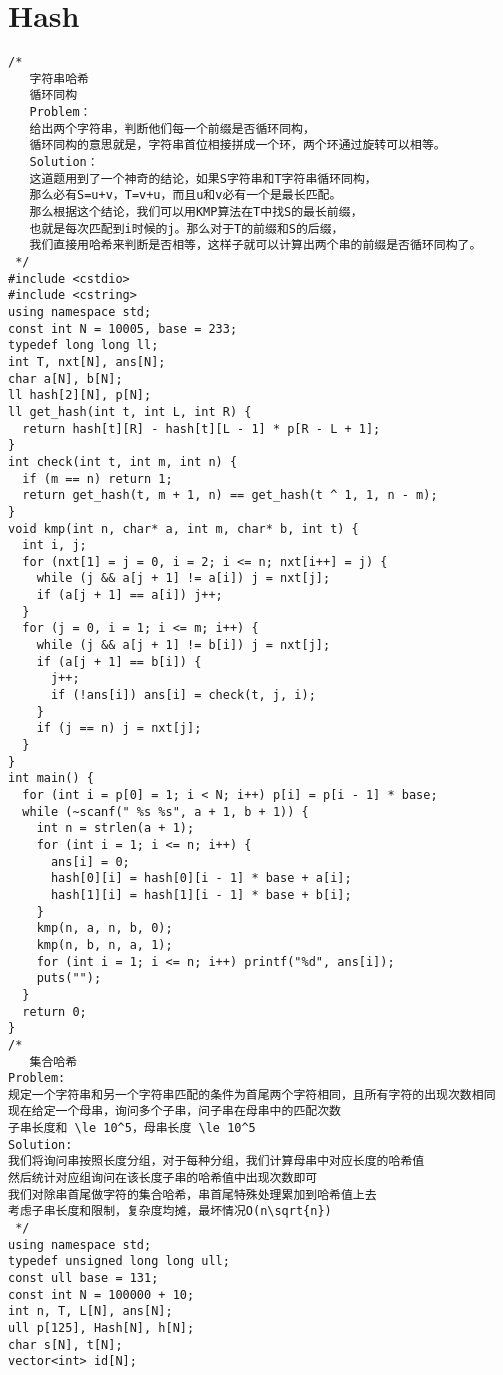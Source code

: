 \section{ Hash}
\begin{lstlisting}
/*
   字符串哈希
   循环同构
   Problem：
   给出两个字符串，判断他们每一个前缀是否循环同构，
   循环同构的意思就是，字符串首位相接拼成一个环，两个环通过旋转可以相等。
   Solution：
   这道题用到了一个神奇的结论，如果S字符串和T字符串循环同构，
   那么必有S=u+v，T=v+u，而且u和v必有一个是最长匹配。
   那么根据这个结论，我们可以用KMP算法在T中找S的最长前缀，
   也就是每次匹配到i时候的j。那么对于T的前缀和S的后缀，
   我们直接用哈希来判断是否相等，这样子就可以计算出两个串的前缀是否循环同构了。
 */
#include <cstdio>
#include <cstring>
using namespace std;
const int N = 10005, base = 233;
typedef long long ll;
int T, nxt[N], ans[N];
char a[N], b[N];
ll hash[2][N], p[N];
ll get_hash(int t, int L, int R) {
  return hash[t][R] - hash[t][L - 1] * p[R - L + 1];
}
int check(int t, int m, int n) {
  if (m == n) return 1;
  return get_hash(t, m + 1, n) == get_hash(t ^ 1, 1, n - m);
}
void kmp(int n, char* a, int m, char* b, int t) {
  int i, j;
  for (nxt[1] = j = 0, i = 2; i <= n; nxt[i++] = j) {
    while (j && a[j + 1] != a[i]) j = nxt[j];
    if (a[j + 1] == a[i]) j++;
  }
  for (j = 0, i = 1; i <= m; i++) {
    while (j && a[j + 1] != b[i]) j = nxt[j];
    if (a[j + 1] == b[i]) {
      j++;
      if (!ans[i]) ans[i] = check(t, j, i);
    }
    if (j == n) j = nxt[j];
  }
}
int main() {
  for (int i = p[0] = 1; i < N; i++) p[i] = p[i - 1] * base;
  while (~scanf(" %s %s", a + 1, b + 1)) {
    int n = strlen(a + 1);
    for (int i = 1; i <= n; i++) {
      ans[i] = 0;
      hash[0][i] = hash[0][i - 1] * base + a[i];
      hash[1][i] = hash[1][i - 1] * base + b[i];
    }
    kmp(n, a, n, b, 0);
    kmp(n, b, n, a, 1);
    for (int i = 1; i <= n; i++) printf("%d", ans[i]);
    puts("");
  }
  return 0;
}
/*
   集合哈希
Problem:
规定一个字符串和另一个字符串匹配的条件为首尾两个字符相同，且所有字符的出现次数相同
现在给定一个母串，询问多个子串，问子串在母串中的匹配次数
子串长度和 \le 10^5，母串长度 \le 10^5
Solution:
我们将询问串按照长度分组，对于每种分组，我们计算母串中对应长度的哈希值
然后统计对应组询问在该长度子串的哈希值中出现次数即可
我们对除串首尾做字符的集合哈希，串首尾特殊处理累加到哈希值上去
考虑子串长度和限制，复杂度均摊，最坏情况O(n\sqrt{n})
 */
using namespace std;
typedef unsigned long long ull;
const ull base = 131;
const int N = 100000 + 10;
int n, T, L[N], ans[N];
ull p[125], Hash[N], h[N];
char s[N], t[N];
vector<int> id[N];

\end{lstlisting}
